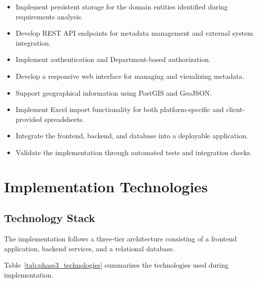 \documentclass[11pt,a4paper]{article}
\begin{document}
\begin{itemize}
    \item Implement persistent storage for the domain entities
    identified during requirements analysis.

    \item Develop REST API endpoints for metadata management
    and external system integration.

    \item Implement authentication and Department-based
    authorization.

    \item Develop a responsive web interface for managing
    and visualizing metadata.

    \item Support geographical information using PostGIS
    and GeoJSON.

    \item Implement Excel import functionality for both
    platform-specific and client-provided spreadsheets.

    \item Integrate the frontend, backend, and database
    into a deployable application.

    \item Validate the implementation through automated
    tests and integration checks.
\end{itemize}


\section{Implementation Technologies}

\subsection{Technology Stack}

The implementation follows a three-tier architecture
consisting of a frontend application, backend services,
and a relational database.

Table~\ref{tab:phase3_technologies} summarizes the
technologies used during implementation.
\end{document}

